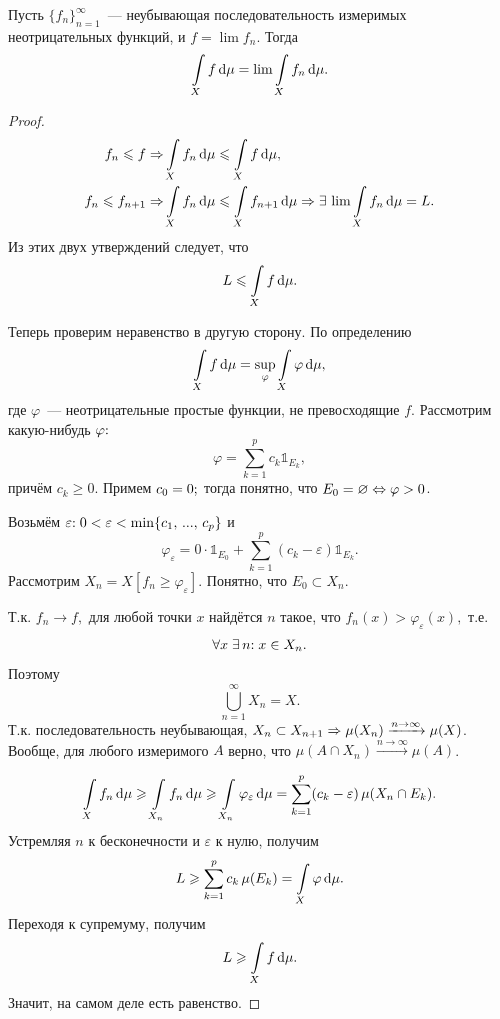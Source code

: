 \documentclass{notes}
\begin{document}
	\begin{thm}
		Пусть $\{f_n\}_{n = 1}^{\infty}$~--- неубывающая последовательность измеримых неотрицательных функций, и $f = \lim f_n$. Тогда
		\[
			\int\limits_{X} f \, \mathrm{d} \mu = \lim \int\limits_{X} f_n \, \mathrm{d} \mu.
		\]
		\begin{proof}
			\begin{align*}
				f_n \leqslant f \Rightarrow& \int\limits_{X} f_n \, \mathrm{d} \mu \leqslant \int\limits_{X} f \, \mathrm{d} \mu, \\
				f_n \leqslant f_{n + 1} \Rightarrow& \int\limits_{X} f_n \, \mathrm{d} \mu \leqslant \int\limits_{X} f_{n+1} \, \mathrm{d} \mu \Rightarrow \exists \, \lim \int\limits_{X} f_n \, \mathrm{d} \mu = L.
			\end{align*}
			Из этих двух утверждений следует, что
			\[
				L \leqslant \int\limits_{X} f \, \mathrm{d} \mu.
			\]

			Теперь проверим неравенство в другую сторону. По определению
			\[
				\int\limits_{X} f \, \mathrm{d} \mu = \sup\limits_{\varphi} \int\limits_{X} \varphi \, \mathrm{d} \mu,
			\]
			где $\varphi$~--- неотрицательные простые функции, не превосходящие $f$. Рассмотрим какую-нибудь $\varphi\text{\text{:}}$
			\[
				\varphi = \sum\limits_{k = 1}^p c_k \mathbb{1}_{E_k},
			\]
			причём $c_k \geqslant 0$. Примем $c_0 = 0\text{\text{;}}$ тогда понятно, что $E_0 = \varnothing \Leftrightarrow \varphi > 0$.

			Возьмём $\varepsilon\text{\text{:}} \; 0 < \varepsilon < \min\{c_1, \, ..., \, c_p\}$ и 
			\[
				\varphi_{\varepsilon} = 0 \cdot \mathbb{1}_{E_0} + \sum\limits_{k = 1}^p (c_k - \varepsilon) \mathbb{1}_{E_k}.
			\]
			Рассмотрим $X_n = X[f_n \geqslant \varphi_{\varepsilon}]$. Понятно, что $E_0 \subset X_n$.

			Т.к. $f_n \to f,$ для любой точки $x$ найдётся $n$ такое, что $f_n(x) > \varphi_{\varepsilon}(x),$ т.е. 
			\[
				\forall x \; \exists \, n \text{\text{:}} \; x \in X_n.
			\]
			Поэтому
			\[
				\bigcup\limits_{n = 1}^{\infty} X_n = X.
			\]
			Т.к. последовательность неубывающая, $X_n \subset X_{n + 1} \Rightarrow \mu(X_n) \xrightarrow{n \to \infty}\mu(X)$. Вообще, для любого измеримого $A$ верно, что $\mu(A \cap X_n) \xrightarrow{n \to \infty}\mu(A)$.

			\[
				\int\limits_{X} f_n \, \mathrm{d} \mu \geqslant \int\limits_{X_n} f_n \, \mathrm{d} \mu \geqslant \int\limits_{X_n} \varphi_{\varepsilon} \, \mathrm{d} \mu = \sum\limits_{k = 1}^p (c_k - \varepsilon) \, \mu(X_n \cap E_k). 
			\]
			Устремляя $n$ к бесконечности и $\varepsilon$ к нулю, получим
			\[
				L \geqslant \sum\limits_{k = 1}^p c_k \, \mu(E_k) = \int\limits_{X} \varphi \, \mathrm{d} \mu.
			\]
			Переходя к супремуму, получим
			\[
				L \geqslant \int\limits_{X} f \, \mathrm{d} \mu.
			\]
			Значит, на самом деле есть равенство.
		\end{proof}
	\end{thm}
\end{document}
